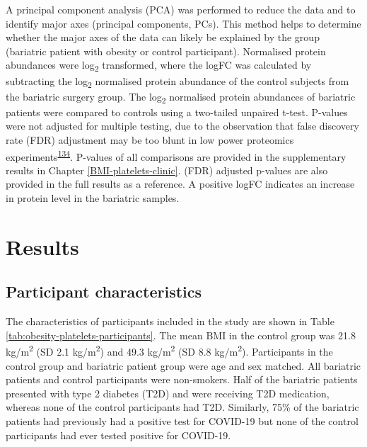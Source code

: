 \documentclass[11pt,twoside]{bristolthesis}
\begin{document}
A principal component analysis (PCA) was performed to reduce the data and to identify major axes (principal components, PCs). This method helps to determine whether the major axes of the data can likely be explained by the group (bariatric patient with obesity or control participant). Normalised protein abundances were log\textsubscript{2} transformed, where the logFC was calculated by subtracting the log\textsubscript{2} normalised protein abundance of the control subjects from the bariatric surgery group. The log\textsubscript{2} normalised protein abundances of bariatric patients were compared to controls using a two-tailed unpaired t-test. P-values were not adjusted for multiple testing, due to the observation that false discovery rate (FDR) adjustment may be too blunt in low power proteomics experiments\textsuperscript{\protect\hyperlink{ref-Pascovici2016}{134}}. P-values of all comparisons are provided in the supplementary results in Chapter \ref{BMI-platelets-clinic}. (FDR) adjusted p-values are also provided in the full results as a reference. A positive logFC indicates an increase in protein level in the bariatric samples.

\hypertarget{results-1}{%
\section{Results}\label{results-1}}

\hypertarget{participant-characteristics}{%
\subsection{Participant characteristics}\label{participant-characteristics}}

The characteristics of participants included in the study are shown in Table \ref{tab:obesity-platelets-participants}. The mean BMI in the control group was 21.8 kg/m\textsuperscript{2} (SD 2.1 kg/m\textsuperscript{2}) and 49.3 kg/m\textsuperscript{2} (SD 8.8 kg/m\textsuperscript{2}). Participants in the control group and bariatric patient group were age and sex matched. All bariatric patients and control participants were non-smokers. Half of the bariatric patients presented with type 2 diabetes (T2D) and were receiving T2D medication, whereas none of the control participants had T2D. Similarly, 75\% of the bariatric patients had previously had a positive test for COVID-19 but none of the control participants had ever tested positive for COVID-19.
\end{document}

